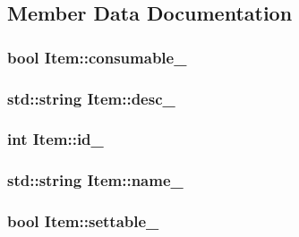 \subsection{Member Data Documentation}
\hypertarget{classItem_a3b4e5d71b0d2f5b87598b4a9d9b4c0f0}{
\subsubsection[{consumable\-\_\-}]{\setlength{\rightskip}{0pt plus 5cm}bool Item\-::consumable\-\_\-\hspace{0.3cm}{\ttfamily [protected]}}}\label{classItem_a3b4e5d71b0d2f5b87598b4a9d9b4c0f0}
\hypertarget{classItem_acf30d82ad77e65a0ff0b1f3f1efa8660}{
\subsubsection[{desc\-\_\-}]{\setlength{\rightskip}{0pt plus 5cm}std\-::string Item\-::desc\-\_\-\hspace{0.3cm}{\ttfamily [protected]}}}\label{classItem_acf30d82ad77e65a0ff0b1f3f1efa8660}
\hypertarget{classItem_acc4aa0295360f0b035b75cebfa81070a}{
\subsubsection[{id\-\_\-}]{\setlength{\rightskip}{0pt plus 5cm}int Item\-::id\-\_\-\hspace{0.3cm}{\ttfamily [protected]}}}\label{classItem_acc4aa0295360f0b035b75cebfa81070a}
\hypertarget{classItem_a5ea323338976e43c1b0e6030f641c9d2}{
\subsubsection[{name\-\_\-}]{\setlength{\rightskip}{0pt plus 5cm}std\-::string Item\-::name\-\_\-\hspace{0.3cm}{\ttfamily [protected]}}}\label{classItem_a5ea323338976e43c1b0e6030f641c9d2}
\hypertarget{classItem_aaca10d54d0fa6e1e090766b81c4a60c9}{
\subsubsection[{settable\-\_\-}]{\setlength{\rightskip}{0pt plus 5cm}bool Item\-::settable\-\_\-\hspace{0.3cm}{\ttfamily [protected]}}}\label{classItem_aaca10d54d0fa6e1e090766b81c4a60c9}
